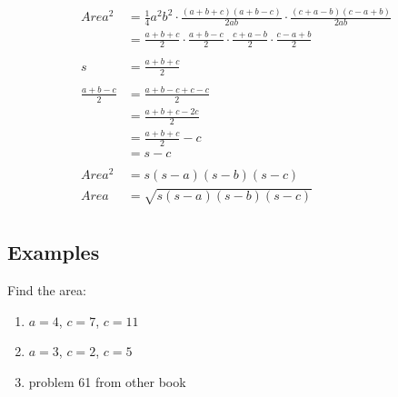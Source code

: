 \documentclass{exam}
\begin{document}
   \begin{align*}
    Area^2 & = \frac{1}{4} a^2 b^2 \cdot \frac{(a + b + c)(a + b - c)}{2ab} \cdot \frac{(c + a - b)(c - a + b)}{2ab} \\
           & = \frac{a + b + c}{2} \cdot \frac{a + b - c}{2} \cdot \frac{c + a - b}{2} \cdot \frac{c - a + b}{2} \\
    \\
    s & = \frac{a + b + c}{2} \\
    \\
    \frac{a + b - c}{2} & = \frac{a + b - c + c - c}{2} \\
                        & = \frac{a + b + c - 2c}{2} \\
                        & = \frac{a + b + c}{2} - c \\
                        & = s - c \\
    \\
    Area^2 & = s (s - a)(s - b)(s - c) \\
    Area   & = \sqrt{s (s - a)(s - b)(s - c)} \\
  \end{align*}

  \subsection{Examples}
  
  Find the area:
  \begin{enumerate}
    \item $a = 4$, $c = 7$, $c = 11$
    \item $a = 3$, $c = 2$, $c = 5$

    \item problem 61 from other book
  \end{enumerate}
\end{document}
